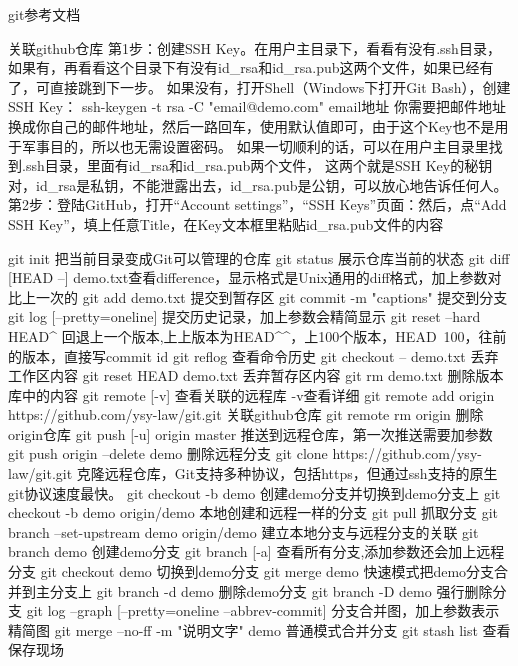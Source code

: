 git参考文档

关联github仓库
第1步：创建SSH Key。在用户主目录下，看看有没有.ssh目录，
       如果有，再看看这个目录下有没有id_rsa和id_rsa.pub这两个文件，如果已经有了，可直接跳到下一步。
       如果没有，打开Shell（Windows下打开Git Bash），创建SSH Key：
       ssh-keygen -t rsa -C "email@demo.com" email地址	 
       你需要把邮件地址换成你自己的邮件地址，然后一路回车，使用默认值即可，由于这个Key也不是用于军事目的，所以也无需设置密码。
       如果一切顺利的话，可以在用户主目录里找到.ssh目录，里面有id_rsa和id_rsa.pub两个文件，
	   这两个就是SSH Key的秘钥对，id_rsa是私钥，不能泄露出去，id_rsa.pub是公钥，可以放心地告诉任何人。	
第2步：登陆GitHub，打开“Account settings”，“SSH Keys”页面：然后，点“Add SSH Key”，填上任意Title，在Key文本框里粘贴id_rsa.pub文件的内容	   

git init                   把当前目录变成Git可以管理的仓库
git status                 展示仓库当前的状态
git diff [HEAD --] demo.txt查看difference，显示格式是Unix通用的diff格式，加上参数对比上一次的
git add  demo.txt          提交到暂存区
git commit -m "captions"   提交到分支
git log [--pretty=oneline] 提交历史记录，加上参数会精简显示
git reset --hard HEAD^     回退上一个版本,上上版本为HEAD^^，上100个版本，HEAD~100，往前的版本，直接写commit id
git reflog                 查看命令历史
git checkout -- demo.txt   丢弃工作区内容
git reset HEAD demo.txt    丢弃暂存区内容 
git rm demo.txt            删除版本库中的内容
git remote [-v] 	       查看关联的远程库 -v查看详细
git remote add origin https://github.com/ysy-law/git.git  关联github仓库
git remote rm origin                                      删除origin仓库
git push [-u] origin master                               推送到远程仓库，第一次推送需要加参数
git push origin --delete demo      删除远程分支
git clone https://github.com/ysy-law/git.git              克隆远程仓库，Git支持多种协议，包括https，但通过ssh支持的原生git协议速度最快。
git checkout -b demo       创建demo分支并切换到demo分支上
git checkout -b demo origin/demo 本地创建和远程一样的分支
git pull  抓取分支
git branch --set-upstream demo origin/demo 建立本地分支与远程分支的关联
git branch demo            创建demo分支
git branch [-a]            查看所有分支,添加参数还会加上远程分支
git checkout demo          切换到demo分支
git merge demo             快速模式把demo分支合并到主分支上
git branch -d demo         删除demo分支
git branch -D demo         强行删除分支
git log --graph [--pretty=oneline --abbrev-commit] 分支合并图，加上参数表示精简图
git merge --no-ff -m "说明文字" demo  普通模式合并分支
git stash list             查看保存现场
